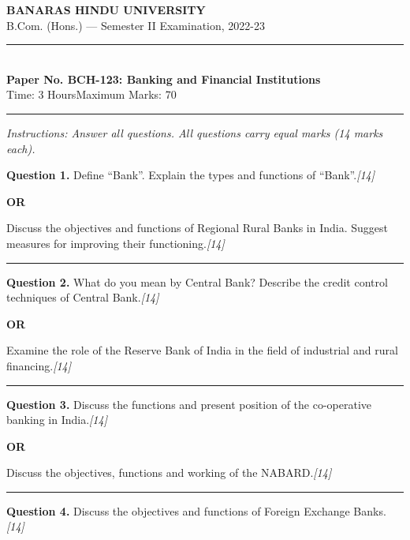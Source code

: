 \documentclass[11pt,a4paper]{article}
\newcommand{\pts}[1]{\hfill   \textit{[#1]}}
\begin{document}
\begin{center}
  {\large\bfseries BANARAS HINDU UNIVERSITY}\\[2pt]
  {\normalsize B.Com. (Hons.) --- Semester II Examination, 2022-23}\\[6pt]
  \rule{0.8\linewidth}{0.5pt}\\[6pt]
  {\large\bfseries Paper No. BCH-123: Banking and Financial Institutions}\\[4pt]
  {\normalsize Time: 3 Hours\hfill Maximum Marks: 70}
\end{center}

\rule{\linewidth}{0.4pt}

\smallskip



\noindent   \textit{Instructions: Answer all questions. All questions carry equal marks (14 marks each).}

\bigskip




\noindent   \textbf{Question 1.}
Define ``Bank''. Explain the types and functions of ``Bank''.\pts{14}

\centerline{   \textbf{OR}}

Discuss the objectives and functions of Regional Rural Banks in India. Suggest measures for improving their functioning.\pts{14}

\medskip\rule{\linewidth}{0.2pt}




\noindent   \textbf{Question 2.}
What do you mean by Central Bank? Describe the credit control techniques of Central Bank.\pts{14}

\centerline{   \textbf{OR}}

Examine the role of the Reserve Bank of India in the field of industrial and rural financing.\pts{14}

\medskip\rule{\linewidth}{0.2pt}




\noindent   \textbf{Question 3.}
Discuss the functions and present position of the co-operative banking in India.\pts{14}

\centerline{   \textbf{OR}}

Discuss the objectives, functions and working of the NABARD.\pts{14}

\medskip\rule{\linewidth}{0.2pt}




\noindent   \textbf{Question 4.}
Discuss the objectives and functions of Foreign Exchange Banks.\pts{14}
\end{document}

